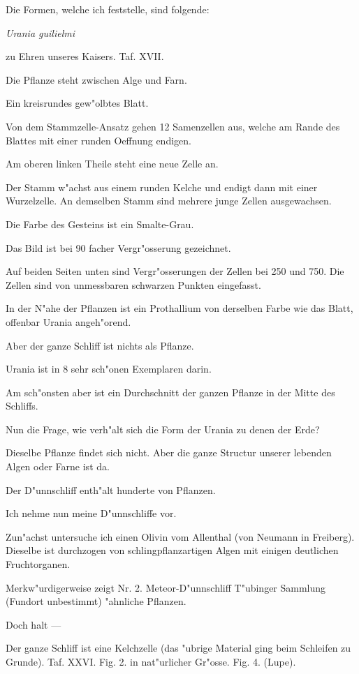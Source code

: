 \documentclass[a4paper, 11pt, oneside, german]{article}
\begin{document}
Die Formen, welche ich feststelle, sind folgende:

\emph{Urania guilielmi}

zu Ehren unseres Kaisers. Taf. XVII.

Die Pflanze steht zwischen Alge und Farn.

Ein kreisrundes gew"olbtes Blatt.

Von dem Stammzelle-Ansatz gehen 12 Samenzellen aus, welche am Rande des Blattes mit einer runden Oeffnung endigen.

Am oberen linken Theile steht eine neue Zelle an.

Der Stamm w"achst aus einem runden Kelche und endigt dann mit einer Wurzelzelle. An demselben Stamm sind mehrere junge Zellen ausgewachsen.

Die Farbe des Gesteins ist ein Smalte-Grau.

Das Bild ist bei 90 facher Vergr"osserung gezeichnet.

Auf beiden Seiten unten sind Vergr"osserungen der Zellen bei 250 und 750. Die Zellen sind von unmessbaren schwarzen Punkten eingefasst.

In der N"ahe der Pflanzen ist ein Prothallium von derselben Farbe wie das Blatt, offenbar Urania angeh"orend.

Aber der ganze Schliff ist nichts als Pflanze.

Urania ist in 8 sehr sch"onen Exemplaren darin.

Am sch"onsten aber ist ein Durchschnitt der ganzen Pflanze in der Mitte des Schliffs.

Nun die Frage, wie verh"alt sich die Form der Urania zu denen der Erde?

Dieselbe Pflanze findet sich nicht. Aber die ganze Structur unserer lebenden Algen oder Farne ist da.

Der D"unnschliff enth"alt hunderte von Pflanzen.

Ich nehme nun meine D"unnschliffe vor.

Zun"achst untersuche ich einen Olivin vom Allenthal (von Neumann in Freiberg). Dieselbe ist durchzogen von schlingpflanzartigen Algen mit einigen deutlichen Fruchtorganen.

Merkw"urdigerweise zeigt Nr. 2. Meteor-D"unnschliff T"ubinger Sammlung (Fundort unbestimmt) "ahnliche Pflanzen.

Doch halt ---

Der ganze Schliff ist eine Kelchzelle (das "ubrige Material ging beim Schleifen zu Grunde). Taf. XXVI. Fig. 2. in nat"urlicher Gr"osse. Fig. 4. (Lupe).
\end{document}
